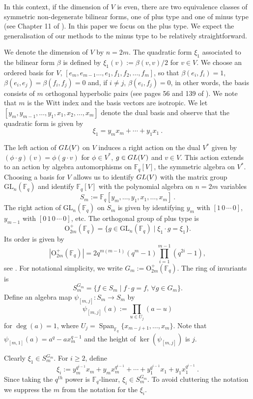 \documentclass{amsart}
\newcommand{\field}{\mathbb{F}}
\newcommand{\gl}[2]{{{\text{GL}_{{#1}}(\field_{#2})}}}
\newcommand{\orthp}[2]{{{\text{O}^{+}_{{#1}}(\field_{#2})}}}
\newcommand{\invring}{S_m^{G_m}}
\DeclareMathOperator{\Span}{Span}
\begin{document}
In this context, if the dimension of $V$ is even, there are two equivalence classes of symmetric non-degenerate
bilinear forms, one of plus type and one of minus type
(see Chapter 11 of \cite{taylor-classicalgroups:92}).
In this paper we focus on the plus type. 
We expect the generalisation of our methods to the minus type to be relatively straightforward. 

We denote the dimension of $V$ by $n=2m$.
The quadratic form $\xi_1$ associated to the bilinear form $\beta$ is defined by $\xi_1(v):=\beta(v,v)/2$ for $v\in V$.
We choose an ordered basis for $V$, 
$[e_m,e_{m-1}\ldots,e_1,f_1,f_2,\ldots, f_m]$, 
so that $\beta(e_i,f_i)=1$, $\beta(e_i,e_j)=\beta(f_i,f_j)=0$
and, if $i\not=j$, $\beta(e_i,f_j)=0$, in other words,
the basis consists of $m$ orthogonal hyperbolic pairs
(see pages 56 and 139 of \cite{taylor-classicalgroups:92}).
We note that $m$ is the Witt index and the basis vectors are isotropic.
We let $[y_m,y_{m-1},\ldots,y_1,x_1,x_2,\ldots,x_m]$ denote the dual basis and observe that the quadratic form is given by 
$$\xi_1=y_mx_m+\cdots +y_1x_1\ .$$

The left action of ${\rm GL}(V)$ on $V$ induces a right action on the dual $V^*$ given by $(\phi\cdot g)(v)=\phi(g\cdot v)$ for $\phi\in V^*$, 
$g\in {\rm GL}(V)$ and $v\in V$. This action extends to an action by algebra automorphisms on $\field_q[V]$, the symmetric algebra on $V^*$.
Choosing a basis for $V$ allows us to identify ${\rm GL}(V)$
with the matrix group $\gl{n}{q}$ and
identify $\field_q[V]$ with
the polynomial algebra on $n=2m$ variables
$$S_m:=\field_q[y_m,\ldots,y_1,x_1,\ldots,x_m]\ .$$
The right action of 
$\gl{n}{q}$ on $S_m$ is given by identifying $y_m$ with 
$[1\, 0 \,\cdots\, 0]$, $y_{m-1}$ with $[0\, 1\, 0 \,\cdots\, 0]$, etc.
The orthogonal group of plus type is 
$$\orthp{2m}{q}=\{g\in \gl{n}{q}\mid \xi_1\cdot g=\xi_1\}.$$
Its order is  given by 
$$|\orthp{2m}{q}| = 2 q^{m(m-1)}(q^m-1)\prod_{i=1}^{m-1}(q^{2i}-1),$$
see \cite[page 141]{taylor-classicalgroups:92}.
For notational simplicity, we write $G_m:=\orthp{2m}{q}$.
The ring of invariants is 
$$\invring=\{f\in S_m\mid f\cdot g=f, \,\forall g\in G_m\}.$$
Define an algebra map $\psi_{[m,j]}:S_m\to S_m$ by
$$\psi_{[m,j]}(a):=\prod_{u\in U_j}(a-u)$$
for $\deg(a)=1$, where $U_j = \Span_{\field_q}\{x_{m-j+1},\ldots,x_m \}$.
Note that $\psi_{[m,1]}(a)=a^q-ax_m^{q-1}$ and 
the height of $\ker(\psi_{[m,j]})$ is $j$.

Clearly $\xi_1\in \invring$.
For $i\geq 2$, define 
$$\xi_{i}:=y_m^{q^{i-1}}x_m+y_mx_m^{q^{i-1}}+\cdots +y_1^{q^{i-1}}x_1 +y_1x_1^{q^{i-1}}\ .$$
Since taking the $q^{th}$ power is $\field_q$-linear, $\xi_{i}\in \invring$. 
To avoid cluttering the notation we suppress the $m$ from the notation for the $\xi_{i}$.
\end{document}
